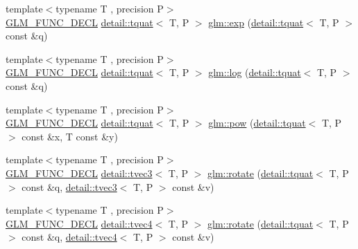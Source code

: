 \begin{DoxyCompactItemize}
\item 
{\footnotesize template$<$typename T , precision P$>$ }\\\hyperlink{setup_8hpp_ab2d052de21a70539923e9bcbf6e83a51}{G\+L\+M\+\_\+\+F\+U\+N\+C\+\_\+\+D\+E\+CL} \hyperlink{structglm_1_1detail_1_1tquat}{detail\+::tquat}$<$ T, P $>$ \hyperlink{group__gtx__quaternion_gaadebfad5c8b4b3dde114915f0494b739}{glm\+::exp} (\hyperlink{structglm_1_1detail_1_1tquat}{detail\+::tquat}$<$ T, P $>$ const \&q)
\item 
{\footnotesize template$<$typename T , precision P$>$ }\\\hyperlink{setup_8hpp_ab2d052de21a70539923e9bcbf6e83a51}{G\+L\+M\+\_\+\+F\+U\+N\+C\+\_\+\+D\+E\+CL} \hyperlink{structglm_1_1detail_1_1tquat}{detail\+::tquat}$<$ T, P $>$ \hyperlink{group__gtx__quaternion_ga832e6b69f9e5f596cad8bada9ebb4477}{glm\+::log} (\hyperlink{structglm_1_1detail_1_1tquat}{detail\+::tquat}$<$ T, P $>$ const \&q)
\item 
{\footnotesize template$<$typename T , precision P$>$ }\\\hyperlink{setup_8hpp_ab2d052de21a70539923e9bcbf6e83a51}{G\+L\+M\+\_\+\+F\+U\+N\+C\+\_\+\+D\+E\+CL} \hyperlink{structglm_1_1detail_1_1tquat}{detail\+::tquat}$<$ T, P $>$ \hyperlink{group__gtx__quaternion_ga9c9854d641f71f853cfed9dc5d4ef762}{glm\+::pow} (\hyperlink{structglm_1_1detail_1_1tquat}{detail\+::tquat}$<$ T, P $>$ const \&x, T const \&y)
\item 
{\footnotesize template$<$typename T , precision P$>$ }\\\hyperlink{setup_8hpp_ab2d052de21a70539923e9bcbf6e83a51}{G\+L\+M\+\_\+\+F\+U\+N\+C\+\_\+\+D\+E\+CL} \hyperlink{structglm_1_1detail_1_1tvec3}{detail\+::tvec3}$<$ T, P $>$ \hyperlink{group__gtx__quaternion_gaa4ac5806c1c001ac0247b1e1fd07dddf}{glm\+::rotate} (\hyperlink{structglm_1_1detail_1_1tquat}{detail\+::tquat}$<$ T, P $>$ const \&q, \hyperlink{structglm_1_1detail_1_1tvec3}{detail\+::tvec3}$<$ T, P $>$ const \&v)
\item 
{\footnotesize template$<$typename T , precision P$>$ }\\\hyperlink{setup_8hpp_ab2d052de21a70539923e9bcbf6e83a51}{G\+L\+M\+\_\+\+F\+U\+N\+C\+\_\+\+D\+E\+CL} \hyperlink{structglm_1_1detail_1_1tvec4}{detail\+::tvec4}$<$ T, P $>$ \hyperlink{group__gtx__quaternion_ga3461e43b8c7da533b10bc5e9961add80}{glm\+::rotate} (\hyperlink{structglm_1_1detail_1_1tquat}{detail\+::tquat}$<$ T, P $>$ const \&q, \hyperlink{structglm_1_1detail_1_1tvec4}{detail\+::tvec4}$<$ T, P $>$ const \&v)
\item 

\end{DoxyCompactItemize}
